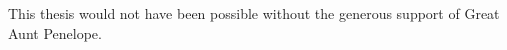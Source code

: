 %
%
%
%
%
This thesis would not have been possible without the generous
support of Great Aunt Penelope.

